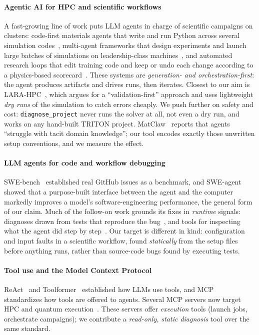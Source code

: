 \documentclass[conference]{IEEEtran}
\begin{document}
\paragraph{Agentic AI for HPC and scientific workflows}
A fast-growing line of work puts LLM agents in charge of scientific campaigns on clusters:
code-first materials agents that write and run Python across several simulation codes~\cite{matclaw},
multi-agent frameworks that design experiments and launch large batches of simulations on
leadership-class machines~\cite{mada,materials-aurora}, and automated research loops that edit
training code and keep or undo each change according to a physics-based scorecard~\cite{mlipilot}.
These systems are \emph{generation- and orchestration-first}: the agent produces artifacts and drives
runs, then iterates. Closest to our aim is LARA-HPC~\cite{lara}, which argues for a
``validation-first'' approach and uses lightweight \emph{dry runs} of the simulation to catch errors
cheaply. We push further on safety and cost: \texttt{diagnose\_project} never runs the solver at
all, not even a dry run, and works on any hand-built TRITON project. MatClaw~\cite{matclaw}
reports that agents ``struggle with tacit domain knowledge''; our tool encodes exactly those
unwritten setup conventions, and we measure the effect.

\paragraph{LLM agents for code and workflow debugging}
SWE-bench~\cite{swebench} established real GitHub issues as a benchmark, and
SWE-agent~\cite{sweagent} showed that a purpose-built interface between the agent and the computer
markedly improves a model's software-engineering performance, the general form of our claim.
Much of the follow-on work grounds its fixes in \emph{runtime}
signals: diagnoses drawn from tests that reproduce the bug~\cite{swedoctor}, and tools for inspecting
what the agent did step by step~\cite{agentstepper}. Our target is different in kind: configuration
and input faults in a scientific workflow, found \emph{statically} from the setup files before
anything runs, rather than source-code bugs found by executing tests.

\paragraph{Tool use and the Model Context Protocol}
ReAct~\cite{react} and Toolformer~\cite{toolformer} established how LLMs use tools, and MCP~\cite{mcp}
standardizes how tools are offered to agents. Several MCP servers now target HPC and quantum
execution~\cite{mcp-quantum,materials-aurora}. These servers offer \emph{execution} tools (launch
jobs, orchestrate campaigns); we contribute a \emph{read-only, static diagnosis} tool over the
same standard.
\end{document}
